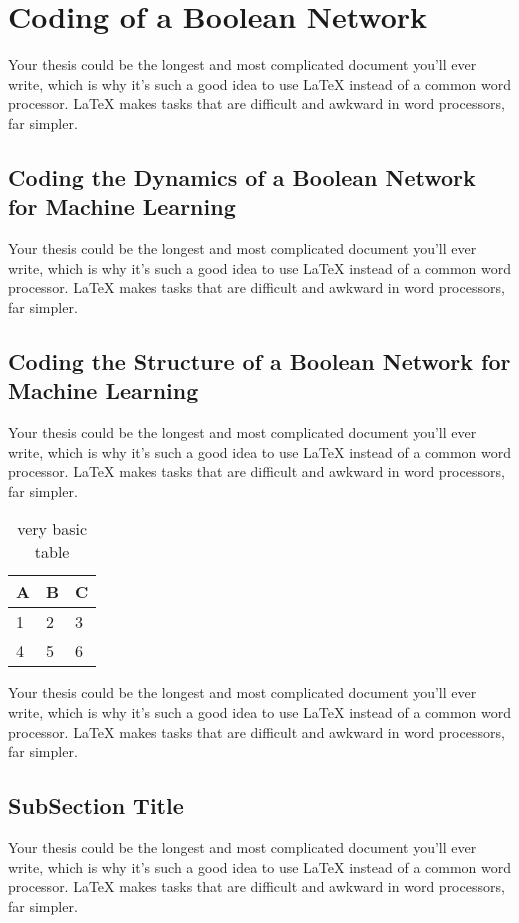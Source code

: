 \section{Coding of a Boolean Network}
Your thesis could be the longest and most complicated document you'll ever write, which is why it's such a good idea to use LaTeX instead of a common word processor. LaTeX makes tasks that are difficult and awkward in word processors, far simpler.

\subsection{Coding the Dynamics of a Boolean Network for Machine Learning}
Your thesis could be the longest and most complicated document you'll ever write, which is why it's such a good idea to use LaTeX instead of a common word processor. LaTeX makes tasks that are difficult and awkward in word processors, far simpler.
\subsection{Coding the Structure of a Boolean Network for Machine Learning}
Your thesis could be the longest and most complicated document you'll ever write, which is why it's such a good idea to use LaTeX instead of a common word processor. LaTeX makes tasks that are difficult and awkward in word processors, far simpler.

\begin{table}[h]
\centering
\begin{tabular}{l | l | l}
A & B & C \\
\hline
1 & 2 & 3 \\
4 & 5 & 6
\end{tabular}
\caption{very basic table}
\label{tab:abc}
\end{table}

Your thesis could be the longest and most complicated document you'll ever write, which is why it's such a good idea to use LaTeX instead of a common word processor. LaTeX makes tasks that are difficult and awkward in word processors, far simpler.

\subsection{SubSection Title}
Your thesis could be the longest and most complicated document you'll ever write, which is why it's such a good idea to use LaTeX instead of a common word processor. LaTeX makes tasks that are difficult and awkward in word processors, far simpler.

